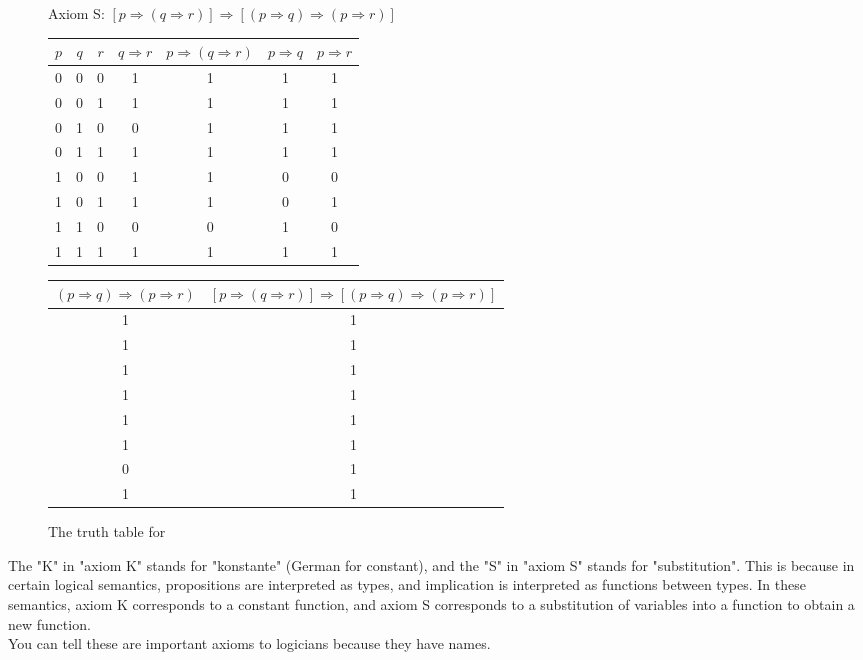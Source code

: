 \documentclass[11pt]{article}
\begin{document}
\begin{figure}[H]
    \caption{The truth table for }
    \label{fig:axiomSTruthTable}
    \centering
    Axiom S: $[p \Rightarrow (q \Rightarrow r)] \Rightarrow [(p \Rightarrow q) \Rightarrow (p \Rightarrow r)]$
    \vspace{10pt} \\
    \begin{tabular}{|c|c|c|c|c|c|c}
        \hline
        $p$ & $q$ & $r$ & $q \Rightarrow r$ & $p \Rightarrow (q \Rightarrow r)$ & $p \Rightarrow q$ & $p \Rightarrow r$   \\ \hline
        0 & 0 & 0 & 1 & 1& 1& 1\\
        0 & 0 & 1 & 1 & 1& 1& 1\\
        0 & 1 & 0 & 0 & 1& 1& 1\\
        0 & 1 & 1 & 1 & 1& 1& 1\\
        1 & 0 & 0 & 1 & 1& 0& 0\\
        1 & 0 & 1 & 1 & 1& 0& 1\\
        1 & 1 & 0 & 0 & 0& 1& 0\\
        1 & 1 & 1 & 1 & 1& 1& 1\\ \hline
         \hline
    \end{tabular}
    \begin{tabular}{c|c|}
        \hline
          $(p \Rightarrow q) \Rightarrow (p \Rightarrow r)$ & $[p \Rightarrow (q \Rightarrow r)] \Rightarrow [(p \Rightarrow q) \Rightarrow (p \Rightarrow r)]$\\ \hline
          1& 1\\
          1& 1\\
          1& 1\\
          1& 1\\
          1& 1\\
          1& 1\\
          0& 1\\
          1& 1\\ \hline
    \end{tabular}
\end{figure}
\begin{sidenote}
    The "K" in "axiom K" stands for "konstante" (German for constant), and the "S" in "axiom S" stands for "substitution". This is because in certain logical semantics, propositions are interpreted as types, and implication is interpreted as functions between types. In these semantics, axiom K corresponds to a constant function, and axiom S corresponds to a substitution of variables into a function to obtain a new function.
    \\ You can tell these are important axioms to logicians because they have names.
\end{sidenote}
\pagebreak
\end{document}
